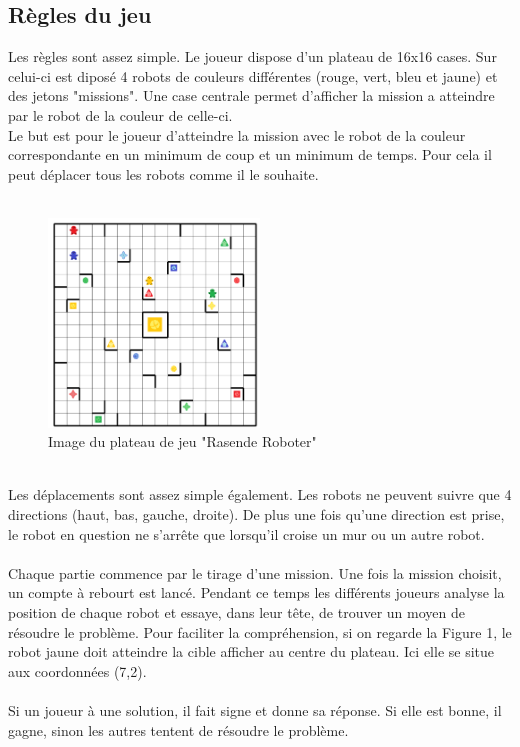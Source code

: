 \documentclass{article}
\begin{document}
\subsection{Règles du jeu}
Les règles sont assez simple. Le joueur dispose d'un plateau de 16x16 cases. Sur celui-ci est diposé 4 robots de couleurs différentes (rouge, vert, bleu et jaune) et des jetons "missions". Une case centrale permet d'afficher la mission a atteindre par le robot de la couleur de celle-ci.\\ Le but est pour le joueur d'atteindre la mission avec le robot de la couleur correspondante en un minimum de coup et un minimum de temps. Pour cela il peut déplacer tous les robots comme il le souhaite.\\\\
\begin{figure}[h]
  \centering  
  \includegraphics[width=0.5\textwidth]{map_rasende.png}  
  \caption{Image du plateau de jeu "Rasende Roboter"} 
  \label{fig:Plateau}  
\end{figure}
\\
Les déplacements sont assez simple également. Les robots ne peuvent suivre que 4 directions (haut, bas, gauche, droite). De plus une fois qu'une direction est prise, le robot en question ne s'arrête que lorsqu'il croise un mur ou un autre robot.\\\\Chaque partie commence par le tirage d'une mission. Une fois la mission choisit, un compte à rebourt est lancé. Pendant ce temps les différents joueurs analyse la position de chaque robot et essaye, dans leur tête, de trouver un moyen de résoudre le problème. Pour faciliter la compréhension, si on regarde la Figure 1, le robot jaune doit atteindre la cible afficher au centre du plateau. Ici elle se situe aux coordonnées (7,2).\\\\
Si un joueur à une solution, il fait signe et donne sa réponse. Si elle est bonne, il gagne, sinon les autres tentent de résoudre le problème.
\end{document}
